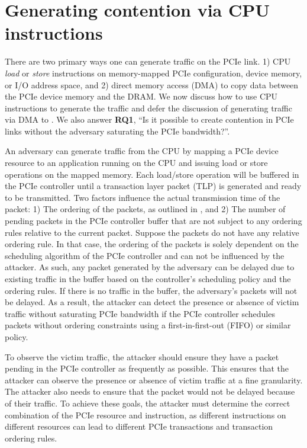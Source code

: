 \section{Generating contention via CPU instructions}
\label{sec:interconnect-sc-store-ops}

There are two primary ways one can generate traffic on the PCIe link.
1) CPU \textit{load} or \textit{store} instructions on memory-mapped PCIe configuration, device memory, or I/O address space, and 
2) direct memory access (DMA) to copy data between the PCIe device memory and the DRAM.
We now discuss how to use CPU instructions to generate the traffic and defer the discussion of generating traffic via DMA to .
We also answer \textbf{RQ1}, ``Is it possible to create contention in PCIe links without the adversary saturating the PCIe bandwidth?''.

An adversary can generate traffic from the CPU by mapping a PCIe device resource to an application running on the CPU and issuing load or store operations on the mapped memory.
Each load/store operation will be buffered in the PCIe controller until a transaction layer packet (TLP) is generated and ready to be transmitted.
Two factors influence the actual transmission time of the packet:
1) The ordering of the packets, as outlined in , and
2) The number of pending packets in the PCIe controller buffer that are not subject to any ordering rules relative to the current packet.
Suppose the packets do not have any relative ordering rule. 
In that case, the ordering of the packets is solely dependent on the scheduling algorithm of the PCIe controller and can not be influenced by the attacker.
As such, any packet generated by the adversary can be delayed due to existing traffic in the buffer based on the controller's scheduling policy and the ordering rules.
If there is no traffic in the buffer, the adversary's packets will not be delayed.
As a result, the attacker can detect the presence or absence of victim traffic without saturating PCIe bandwidth if the PCIe controller schedules packets without ordering constraints using a first-in-first-out (FIFO) or similar policy.

To observe the victim traffic, the attacker should ensure they have a packet pending in the PCIe controller as frequently as possible.
This ensures that the attacker can observe the presence or absence of victim traffic at a fine granularity.
The attacker also needs to ensure that the packet would not be delayed because of their traffic.
To achieve these goals, the attacker must determine the correct combination of the PCIe resource and instruction, as different instructions on different resources can lead to different PCIe transactions and transaction ordering rules.




% 
